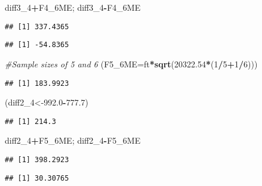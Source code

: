 \documentclass[]{article}
\newenvironment{Shaded}{\begin{snugshade}}{\end{snugshade}}
\newcommand{\KeywordTok}[1]{\textcolor[rgb]{0.13,0.29,0.53}{\textbf{#1}}}
\newcommand{\DataTypeTok}[1]{\textcolor[rgb]{0.13,0.29,0.53}{#1}}
\newcommand{\DecValTok}[1]{\textcolor[rgb]{0.00,0.00,0.81}{#1}}
\newcommand{\FloatTok}[1]{\textcolor[rgb]{0.00,0.00,0.81}{#1}}
\newcommand{\CommentTok}[1]{\textcolor[rgb]{0.56,0.35,0.01}{\textit{#1}}}
\newcommand{\OperatorTok}[1]{\textcolor[rgb]{0.81,0.36,0.00}{\textbf{#1}}}
\newcommand{\NormalTok}[1]{#1}
\begin{document}
\begin{Shaded}
\begin{Highlighting}[]
\NormalTok{diff3_}\DecValTok{4}\OperatorTok{+}\NormalTok{F4_6ME; diff3_}\DecValTok{4}\OperatorTok{-}\NormalTok{F4_6ME}
\end{Highlighting}
\end{Shaded}

\begin{verbatim}
## [1] 337.4365
\end{verbatim}

\begin{verbatim}
## [1] -54.8365
\end{verbatim}

\begin{Shaded}
\begin{Highlighting}[]
\CommentTok{#Sample sizes of 5 and 6}
\NormalTok{(}\DataTypeTok{F5_6ME=}\NormalTok{ft}\OperatorTok{*}\KeywordTok{sqrt}\NormalTok{(}\FloatTok{20322.54}\OperatorTok{*}\NormalTok{(}\DecValTok{1}\OperatorTok{/}\DecValTok{5}\OperatorTok{+}\DecValTok{1}\OperatorTok{/}\DecValTok{6}\NormalTok{)))}
\end{Highlighting}
\end{Shaded}

\begin{verbatim}
## [1] 183.9923
\end{verbatim}

\begin{Shaded}
\begin{Highlighting}[]
\NormalTok{(diff2_}\DecValTok{4}\NormalTok{<-}\FloatTok{992.0}\OperatorTok{-}\FloatTok{777.7}\NormalTok{)}
\end{Highlighting}
\end{Shaded}

\begin{verbatim}
## [1] 214.3
\end{verbatim}

\begin{Shaded}
\begin{Highlighting}[]
\NormalTok{diff2_}\DecValTok{4}\OperatorTok{+}\NormalTok{F5_6ME; diff2_}\DecValTok{4}\OperatorTok{-}\NormalTok{F5_6ME}
\end{Highlighting}
\end{Shaded}

\begin{verbatim}
## [1] 398.2923
\end{verbatim}

\begin{verbatim}
## [1] 30.30765
\end{verbatim}
\end{document}
